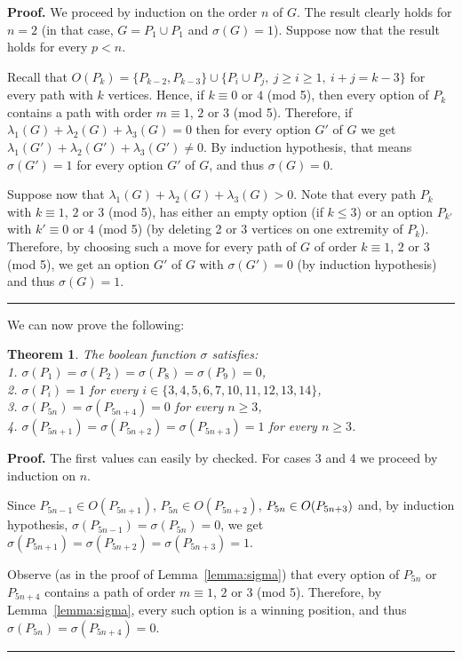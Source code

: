 \documentclass[11pt]{article}
\newcommand{\modif}[1]{\textcolor{black}{#1}}
\newtheorem{theorem}{Theorem}
\newcommand\qed{\mbox{}\hfill\rule{0.5em}{0.809em}\par\vskip 5mm}
\newenvironment{proof}[0]{\noindent\textbf{Proof.}}{\qed}
\newcommand{\modu}[1]{({\rm mod} #1)}
\begin{document}
\begin{proof}
We proceed by induction on the order $n$ of $G$.
The result clearly holds for $n=2$ (in that case, $G=P_1\cup P_1$
and $\sigma(G)=1$).
Suppose now that the result holds for every $p<n$.

Recall that
$O(P_k)=\{P_{k-2},P_{k-3}\}\cup\{P_i\cup P_j,\ j\ge i\ge 1,\ i+j=k-3\}$
for every path with $k$ vertices. 
Hence, if $k\equiv 0$ or $4$ \modu{5},
then every option of $P_k$
contains a path with order $m\equiv 1$, $2$ or $3$ \modu{5}.
Therefore, if $\lambda_1(G)+\lambda_2(G)+\lambda_3(G)=0$
then for every option $G'$ of $G$ we get
$\lambda_1(G')+\lambda_2(G')+\lambda_3(G')\neq 0$.
By induction hypothesis, that means $\sigma(G')=1$
for every option $G'$ of $G$, and thus $\sigma(G)=0$.

Suppose now that $\lambda_1(G)+\lambda_2(G)+\lambda_3(G)>0$.
Note that every path $P_k$ with $k\equiv 1$, $2$ or $3$ \modu{5},
has either an empty option (if $k\le 3$) or an option $P_{k'}$
with $k'\equiv 0$ or $4$ \modu{5} (by deleting 2 or 3 vertices
on one extremity of $P_k$). Therefore, by choosing such a move
for every path of $G$ of order $k\equiv 1$, $2$ or $3$ \modu{5},
we get an option $G'$ of $G$ with $\sigma(G')=0$ (by induction
hypothesis) and thus $\sigma(G)=1$.
\end{proof} 

We can now prove the following:

\begin{theorem}
The boolean function $\sigma$ satisfies:\\
1. $\sigma(P_1)=\sigma(P_2)=\sigma(P_8)=\sigma(P_9)=0$,\\
2. $\sigma(P_i)=1$ for every $i\in\{3,4,5,6,7,10,11,12,13,14\}$,\\
3. $\sigma(P_{5n})=\sigma(P_{5n+4})=0$ for every $n\ge 3$,\\
4. $\sigma(P_{5n+1})=\sigma(P_{5n+2})=\sigma(P_{5n+3})=1$ for every $n\ge 3$.
\label{th:shortened-selective-misere}
\end{theorem}

\begin{proof}
The first values can easily by checked.
For cases 3 and 4 we proceed by induction on $n$.

Since $P_{5n-1}\in O(P_{5n+1})$, $P_{5n}\in O(P_{5n+2})$,
$P_{5n}\in O(P_{5n+\modif{3}})$ and, by induction hypothesis,
$\sigma(P_{5n-1})=\sigma(P_{5n})=0$, we get
$\sigma(P_{5n+1})=\sigma(P_{5n+2})=\sigma(P_{5n+3})=1$.

Observe (as in the proof of Lemma~\ref{lemma:sigma}) that
 every option of $P_{5n}$ or $P_{5n+4}$
contains a path of order $m\equiv 1$, $2$ or $3$ \modu{5}.
Therefore, by Lemma~\ref{lemma:sigma}, every such option
is a winning position, and thus 
$\sigma(P_{5n})=\sigma(P_{5n+4})=0$.
\end{proof}
\end{document}
